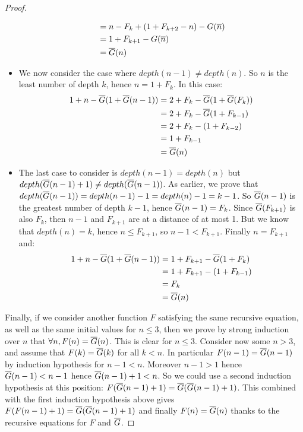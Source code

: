 \documentclass[a4paper,11pt]{article}
\begin{document}
\begin{proof}
\begin{itemize}
\begin{align*}
                    & = n-F_k+(1+F_{k+2}-n)-G(\overline{n}) \\
                    & = 1+F_{k+1}-G(\overline{n}) \\
                    & = \overline{G}(n)
\end{align*}
\item We now consider the case where $depth(n-1)\neq depth(n)$.
So $n$ is the least number of depth $k$, hence $n=1+F_k$.
In this case:
\begin{align*}
1+n-\overline{G}(1+\overline{G}(n-1)) & = 2+F_k-\overline{G}(1+\overline{G}(F_k)) \\
                    & = 2+F_k-\overline{G}(1+F_{k-1}) \\
                    & = 2+F_k-(1+F_{k-2}) \\
                    & = 1+F_{k-1} \\
                    & = \overline{G}(n)
\end{align*}
\item The last case to consider is $depth(n-1)=depth(n)$ but
$depth(\overline{G}(n-1)+1)\neq depth(\overline{G}(n-1))$. As earlier, we prove
that $depth(\overline{G}(n-1))=depth(n-1)-1=depth(n)-1=k-1$. So
$\overline{G}(n-1)$ is the greatest number of depth $k-1$, hence
$\overline{G}(n-1)=F_k$. Since $\overline{G}(F_{k+1})$ is also $F_k$, then $n-1$
and $F_{k+1}$ are at a distance of at most 1. But we know that
$depth(n)=k$, hence $n \le F_{k+1}$, so $n-1 < F_{k+1}$.
Finally $n=F_{k+1}$ and:
\begin{align*}
1+n-\overline{G}(1+\overline{G}(n-1)) & = 1+F_{k+1}-\overline{G}(1+F_k) \\
                    & = 1+F_{k+1}-(1+F_{k-1}) \\
                    & = F_{k} \\
                    & = \overline{G}(n)
\end{align*}
\end{itemize}

Finally, if we consider another function $F$ satisfying
the same recursive equation, as well as the same initial values
for $n\le 3$, then we prove by strong induction over $n$ that
$\forall n, F(n)=\overline{G}(n)$. This is clear for $n\le 3$. Consider now
some $n>3$, and assume that $F(k)=\overline{G}(k)$ for all $k<n$.
In particular $F(n-1)=\overline{G}(n-1)$ by induction hypothesis for
$n-1<n$.
Moreover $n-1>1$ hence $\overline{G}(n-1) < n-1$ hence $\overline{G}(n-1)+1<n$.
So we could use a second induction hypothesis at this position:
$F(\overline{G}(n-1)+1)=\overline{G}(\overline{G}(n-1)+1)$. This combined with the first
induction hypothesis above gives $F(F(n-1)+1)=\overline{G}(\overline{G}(n-1)+1)$
and finally $F(n)=\overline{G}(n)$ thanks to the recursive equations
for $F$ and $\overline{G}$.
\end{proof}
\end{document}
